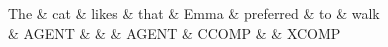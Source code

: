 \documentclass{article}
\begin{document}
\newsavebox\fptrhc


\begin{lrbox}{\fptrhc}\begin{minipage}{\textwidth}

\begin{dependency}[arc edge, arc angle=80, text only label, label style={above}]
\begin{deptext}
The \& cat \& likes \& that \& Emma \& preferred \& to \& walk  \\
\& {\scriptsize AGENT} \& \& \& {\scriptsize AGENT} \& {\scriptsize CCOMP} \& \& {\scriptsize XCOMP}  \\
\end{deptext}

\end{dependency}

\end{minipage}\end{lrbox}

\resizebox{0.8\textwidth}{!}{\usebox\fptrhc}
\end{document}

